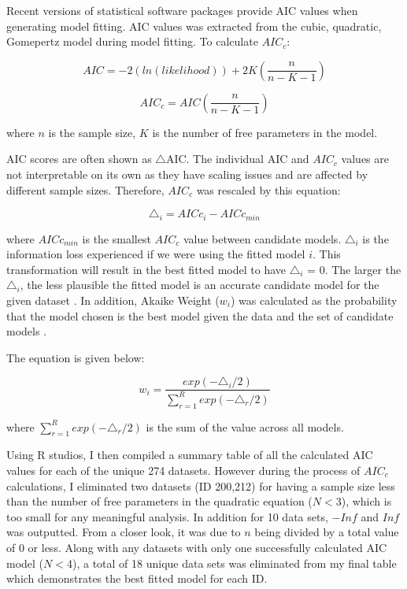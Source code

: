 \documentclass[11pt]{article}
\begin{document}
Recent versions of statistical software packages provide AIC values when generating model fitting. AIC values was extracted 
from the cubic, quadratic, Gomepertz model during model fitting. To calculate $AIC_{c}$: 

    \begin{equation}    
    AIC = -2(ln(likelihood))+2K(\frac{n}{n-K-1})
    \end{equation}

    \begin{equation}    
    AIC_{c}= AIC(\frac{n}{n-K-1})
    \end{equation}

\noindent where $n$ is the sample size, $K$ is the number of free parameters in the model.

AIC scores are often shown as $\triangle$AIC. The individual AIC and $AIC_{c}$ values are not interpretable on its own as they have scaling 
issues and are affected by different sample sizes. Therefore, $AIC_{c}$ was rescaled by this equation: 

    \begin{equation}    
    \triangle_{i}= AICc_{i} - AICc_{min}
    \end{equation}

\noindent where $AICc_{min}$ is the smallest $AIC_{c}$ value between candidate models. $\triangle_{i}$ is the information loss experienced if we were 
using the fitted model $i$. This transformation will result in the best fitted model to have $\triangle_{i}$ = 0. The larger the $\triangle_{i}$, the less 
plausible the fitted model is an accurate candidate model for the given dataset \cite{burnham_multimodel_2004}. In addition, Akaike Weight ($w_{i}$) was calculated as 
the probability that the model chosen is the best model given the data and the set of candidate models \cite{wagenmakers_aic_2004}.

The equation is given below:

    \begin{equation}    
    w_{i}= \frac{exp(-\triangle_{i}/2)}{\sum_{r=1}^{R}exp(-\triangle_{r}/2)}
    \end{equation}

\noindent where $\sum_{r=1}^{R}exp(-\triangle_{r}/2)$ is the sum of the value across all models.  

Using R studios, I then compiled a summary table of all the calculated AIC values for each of the unique 274 datasets. 
However during the process of $AIC_{c}$ calculations, I eliminated two datasets (ID 200,212) for having a sample size 
less than the number of free parameters in the quadratic equation ($N<$3), which is too small for any meaningful analysis. 
In addition for 10 data sets, $-Inf$ and $Inf$ was outputted. From a closer look, it was due to $n$ being divided by a total value 
of 0 or less. Along with any datasets with only one successfully calculated AIC model ($N<$4), a total of 18 unique data 
sets was eliminated from my final table which demonstrates the best fitted model for each ID. 
\end{document}
